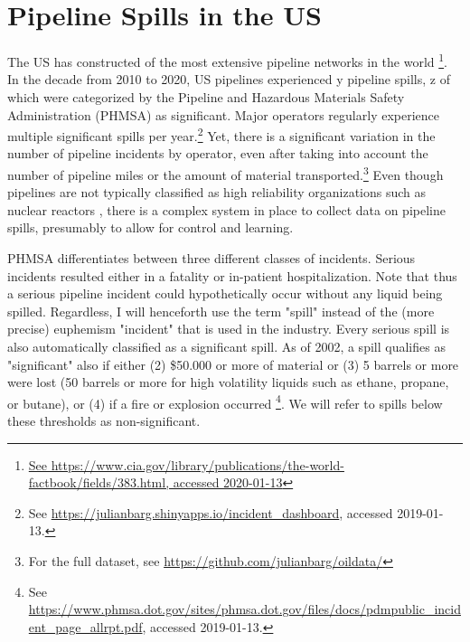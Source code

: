 \section{Pipeline Spills in the US}

The US has constructed of the most extensive pipeline networks in the world \footnote{\url{See https://www.cia.gov/library/publications/the-world-factbook/fields/383.html, accessed 2020-01-13}}. In the decade from 2010 to 2020, US pipelines experienced y pipeline spills, z of which were categorized by the Pipeline and Hazardous Materials Safety Administration (PHMSA) as significant. Major operators regularly experience multiple significant spills per year.\footnote{See \url{https://julianbarg.shinyapps.io/incident_dashboard}, accessed 2019-01-13.} Yet, there is a significant variation in the number of pipeline incidents by operator, even after taking into account the number of pipeline miles or the amount of material transported.\footnote{For the full dataset, see \url{https://github.com/julianbarg/oildata/}} Even though pipelines are not typically classified as high reliability organizations such as nuclear reactors \citep[HROs;][]{Weick1999}, there is a complex system in place to collect data on pipeline spills, presumably to allow for control and learning.

PHMSA differentiates between three different classes of incidents. Serious incidents resulted either in a fatality or in-patient hospitalization. Note that thus a serious pipeline incident could hypothetically occur without any liquid being spilled. Regardless, I will henceforth use the term "spill" instead of the (more precise) euphemism "incident" that is used in the industry. Every serious spill is also automatically classified as a significant spill. As of 2002, a spill qualifies as "significant" also if either (2) \$50.000 or more of material or (3) 5 barrels or more were lost (50 barrels or more for high volatility liquids such as ethane, propane, or butane), or (4) if a fire or explosion occurred \footnote{See \url{https://www.phmsa.dot.gov/sites/phmsa.dot.gov/files/docs/pdmpublic_incident_page_allrpt.pdf}, accessed 2019-01-13.}. We will refer to spills below these thresholds as non-significant.

